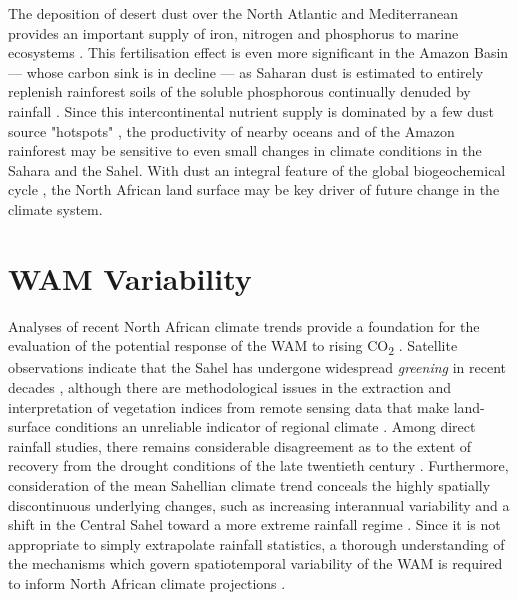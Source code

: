 \documentclass[a4paper]{article}
\begin{document}
The deposition of desert dust over the North Atlantic and Mediterranean provides an important supply of iron, nitrogen and phosphorus to marine ecosystems \parencite{prospero1996saharan, prospero1996atmospheric, guieu2002chemical, mills2004iron, bristow2010fertilizing, okin2011impacts}.
This fertilisation effect is even more significant in the Amazon Basin --- whose carbon sink is in decline \parencite{brienen2015long} --- as Saharan dust is estimated to entirely replenish rainforest soils of the soluble phosphorous continually denuded by rainfall \parencite{swap1992saharan, bristow2010fertilizing, yu2015fertilizing}.
Since this intercontinental nutrient supply is dominated by a few dust source "hotspots" \parencite{koren2006bodele, ben2010transport, schepanski2009saharan, knippertz2010central}, the productivity of nearby oceans and of the Amazon rainforest may be sensitive to even small changes in climate conditions in the Sahara and the Sahel.
With dust an integral feature of the global biogeochemical cycle \parencite{ridgwell2002dust, harrison2001role, jickells2005global, mahowald2005atmospheric}, the North African land surface may be key driver of future change in the climate system.

\section{WAM Variability}
Analyses of recent North African climate trends provide a foundation for the evaluation of the potential response of the WAM to rising CO\textsubscript{2} \parencite{redelsperger2006african}. 
Satellite observations indicate that the Sahel has undergone widespread \emph{greening} in recent decades \parencite{olsson2005recent, dardel2014re}, although there are methodological issues in the extraction and interpretation of vegetation indices from remote sensing data that make land-surface conditions an unreliable indicator of regional climate \parencite{fensholt2013assessing, dardel2014rain}.
Among direct rainfall studies, there remains considerable disagreement as to the extent of recovery from the drought conditions of the late twentieth century \parencite{nicholson2005question, nicholson2013west}.
Furthermore, consideration of the mean Sahellian climate trend conceals the highly spatially discontinuous underlying changes, such as increasing interannual variability and a shift in the Central Sahel toward a more extreme rainfall regime \parencite{nicholson2013west, lebel2009recent, panthou2014recent}.
Since it is not appropriate to simply extrapolate rainfall statistics, a thorough understanding of the mechanisms which govern spatiotemporal variability of the WAM is required to inform North African climate projections \parencite{redelsperger2006african}.
\end{document}
